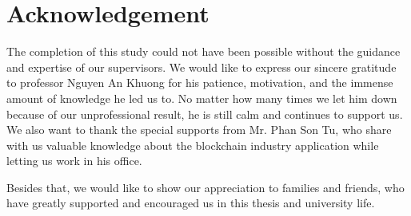 \chapter*{Acknowledgement}
\thispagestyle{empty}
\label{Acknowledgement}
\hspace*{5cm}

The completion of this study could not have been possible without the guidance and expertise of our supervisors. We would like to express our sincere gratitude to professor Nguyen An Khuong for his patience, motivation, and the immense amount of knowledge he led us to. No matter how many times we let him down because of our unprofessional result, he is still calm and continues to support us. We also want to thank the special supports from Mr$.$ Phan Son Tu, who share with us valuable knowledge about the blockchain industry application while letting us work in his office.

Besides that, we would like to show our appreciation to families and friends, who have greatly supported and encouraged us in this thesis and university life.

\cleardoublepage